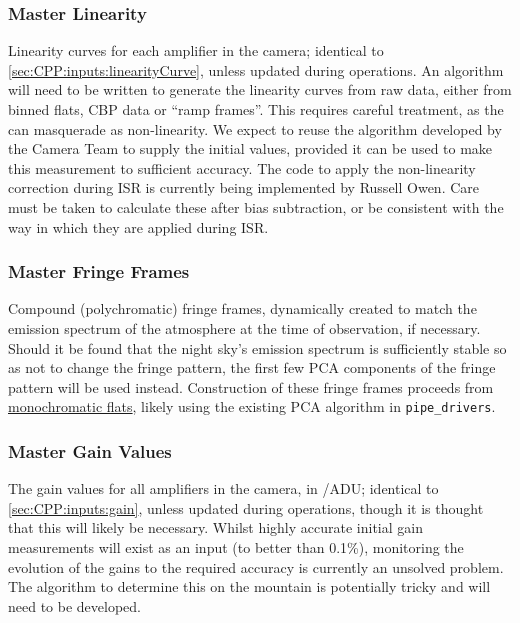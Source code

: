 \subsubsection{Master Linearity}\label{sec:CPP:output:linearityCurve}
Linearity curves for each amplifier in the camera; identical to \secsymbol\ref{sec:CPP:inputs:linearityCurve}, unless updated during operations.
\alg An algorithm will need to be written to generate the linearity curves from raw data, either from binned flats, CBP data or ``ramp frames''. This requires careful treatment, as the \bfeffect can masquerade as non-linearity. We expect to reuse the algorithm developed by the Camera Team to supply the initial values, provided it can be used to make this measurement to sufficient accuracy. The code to apply the non-linearity correction during ISR is currently being implemented by Russell Owen. Care must be taken to calculate these after bias subtraction, or be consistent with the way in which they are applied during ISR.


\subsubsection{Master Fringe Frames}\label{sec:CPP:output:fringeFrames}
Compound (polychromatic) fringe frames, dynamically created to match the emission spectrum of the atmosphere at the time of observation, if necessary. Should it be found that the night sky's emission spectrum is sufficiently stable so as not to change the fringe pattern, the first few PCA components of the fringe pattern will be used instead.
\alg Construction of these fringe frames proceeds from \hyperref[sec:CPP:output:monoPhotoFlat]{monochromatic flats}, likely using the existing PCA algorithm in \texttt{pipe\_drivers}.


\subsubsection{Master Gain Values}\label{sec:CPP:output:gains}
The gain values for all amplifiers in the camera, in \electron/ADU; identical to \secsymbol\ref{sec:CPP:inputs:gain}, unless updated during operations, though it is thought that this will likely be necessary.
\alg Whilst highly accurate initial gain measurements will exist as an input (to better than 0.1\%), monitoring the evolution of the gains to the required accuracy is currently an unsolved problem. The algorithm to determine this on the mountain is potentially tricky and will need to be developed.

